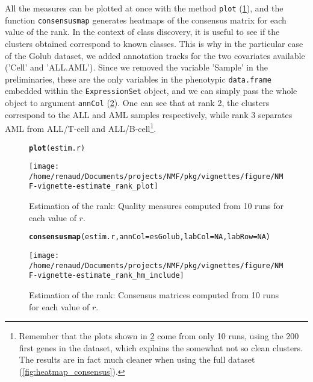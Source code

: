 \documentclass[a4paper]{article}\usepackage[]{graphicx}\usepackage[]{color}
\makeatletter
\def\maxwidth{ %
  \ifdim\Gin@nat@width>\linewidth
    \linewidth
  \else
    \Gin@nat@width
  \fi
}
\newcommand{\hlnum}[1]{\textcolor[rgb]{0.686,0.059,0.569}{#1}}%
\newcommand{\hlstd}[1]{\textcolor[rgb]{0.345,0.345,0.345}{#1}}%
\newcommand{\hlkwc}[1]{\textcolor[rgb]{0.333,0.667,0.333}{#1}}%
\newcommand{\hlkwd}[1]{\textcolor[rgb]{0.737,0.353,0.396}{\textbf{#1}}}%
\newenvironment{kframe}{%
 \def\at@end@of@kframe{}%
 \ifinner\ifhmode%
  \def\at@end@of@kframe{\end{minipage}}%
  \begin{minipage}{\columnwidth}%
 \fi\fi%
 \def\FrameCommand##1{\hskip\@totalleftmargin \hskip-\fboxsep
 \colorbox{shadecolor}{##1}\hskip-\fboxsep
     \hskip-\linewidth \hskip-\@totalleftmargin \hskip\columnwidth}%
 \MakeFramed {\advance\hsize-\width
   \@totalleftmargin\z@ \linewidth\hsize
   \@setminipage}}%
 {\par\unskip\endMakeFramed%
 \at@end@of@kframe}
\newenvironment{knitrout}{}{} %
\let\code=\texttt
\makeatother
\begin{document}
All the measures can be plotted at once with the method \code{plot} (\cref{fig:estim_all}), and the function \code{consensusmap} generates heatmaps of the consensus matrix for each value of the rank.
In the context of class discovery, it is useful to see if the clusters obtained correspond to known classes.
This is why in the particular case of the Golub dataset, we added annotation tracks for the two covariates available ('Cell' and 'ALL.AML').
Since we removed the variable 'Sample' in the preliminaries, these are the only variables in the phenotypic \code{data.frame} embedded within the \code{ExpressionSet} object, and we can simply pass the whole object to argument \code{annCol} (\cref{fig:estim_all_hm}).
One can see that at rank 2, the clusters correspond to the ALL and AML samples respectively, while rank 3 separates AML from ALL/T-cell and ALL/B-cell\footnote{Remember that the plots shown in \cref{fig:estim_all_hm} come from only 10 runs, using the 200 first genes in the dataset, which explains the somewhat not so clean clusters.
The results are in fact much cleaner when using the full dataset (\cref{fig:heatmap_consensus}).}.

\begin{figure}
\begin{knitrout}
\color{fgcolor}\begin{kframe}
\begin{alltt}
\hlkwd{plot}\hlstd{(estim.r)}
\end{alltt}
\end{kframe}
\texttt{[image: /home/renaud/Documents/projects/NMF/pkg/vignettes/figure/NMF-vignette-estimate\_rank\_plot]} 

\end{knitrout}

\caption{Estimation of the rank: Quality measures computed from 10 runs for each value of $r$. \label{fig:estim_all}}
\end{figure}

\begin{figure}
\begin{knitrout}
\color{fgcolor}\begin{kframe}
\begin{alltt}
\hlkwd{consensusmap}\hlstd{(estim.r,} \hlkwc{annCol} \hlstd{= esGolub,} \hlkwc{labCol} \hlstd{=} \hlnum{NA}\hlstd{,} \hlkwc{labRow} \hlstd{=} \hlnum{NA}\hlstd{)}
\end{alltt}
\end{kframe}
\texttt{[image: /home/renaud/Documents/projects/NMF/pkg/vignettes/figure/NMF-vignette-estimate\_rank\_hm\_include]} 

\end{knitrout}

\caption{Estimation of the rank: Consensus matrices computed from 10 runs for each value of $r$. \label{fig:estim_all_hm}}
\end{figure}
\end{document}

